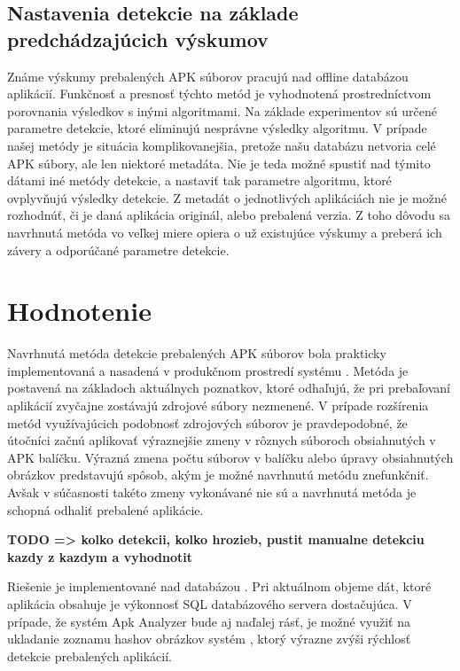 \subsection*{Nastavenia detekcie na základe predchádzajúcich výskumov}
Známe výskumy prebalených APK súborov pracujú nad offline databázou aplikácií. Funkčnosť a presnosť týchto metód je vyhodnotená prostredníctvom porovnania výsledkov s inými algoritmami. Na základe experimentov sú určené parametre detekcie, ktoré eliminujú nesprávne výsledky algoritmu. V prípade našej metódy je situácia komplikovanejšia, pretože našu databázu netvoria celé APK súbory, ale len niektoré metadáta. Nie je teda možné spustiť nad týmito dátami iné metódy detekcie, a nastaviť tak parametre algoritmu, ktoré ovplyvňujú výsledky detekcie. Z metadát o jednotlivých aplikáciách nie je možné rozhodnúť, či je daná aplikácia originál, alebo prebalená verzia.  Z toho dôvodu sa navrhnutá metóda vo veľkej miere opiera o už existujúce výskumy a preberá ich závery a odporúčané parametre detekcie. 

\section{Hodnotenie}
Navrhnutá metóda detekcie prebalených APK súborov bola prakticky implementovaná a nasadená v produkčnom prostredí systému . 
Metóda je postavená na základoch aktuálnych poznatkov, ktoré odhaľujú, že pri prebaľovaní aplikácií zvyčajne zostávajú zdrojové súbory nezmenené. V prípade rozšírenia metód využívajúcich podobnosť zdrojových súborov je pravdepodobné, že útočníci začnú aplikovať výraznejšie zmeny v rôznych súboroch obsiahnutých v APK balíčku. Výrazná zmena počtu súborov v balíčku alebo úpravy obsiahnutých obrázkov predstavujú spôsob, akým je možné navrhnutú metódu znefunkčniť. Avšak v súčasnosti takéto zmeny vykonávané nie sú a navrhnutá metóda je schopná odhaliť prebalené aplikácie.

\textbf{TODO => kolko detekcii, kolko hrozieb, pustit manualne detekciu kazdy z kazdym a vyhodnotit}
 
Riešenie je implementované nad databázou . Pri aktuálnom objeme dát, ktoré aplikácia obsahuje je výkonnosť SQL databázového servera dostačujúca. V prípade, že systém Apk Analyzer bude aj naďalej rásť, je možné využiť na ukladanie zoznamu hashov obrázkov systém , ktorý výrazne zvýši rýchlosť detekcie prebalených aplikácií.